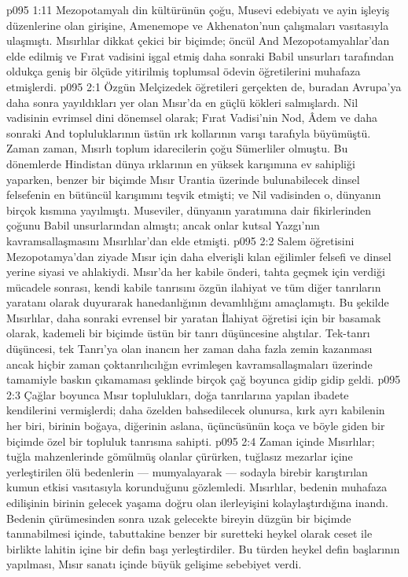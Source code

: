 \vs p095 1:11 Mezopotamyalı din kültürünün çoğu, Musevi edebiyatı ve ayin işleyiş düzenlerine olan girişine, Amenemope ve Akhenaton’nun çalışmaları vasıtasıyla ulaşmıştı. Mısırlılar dikkat çekici bir biçimde; öncül And Mezopotamyalılar’dan elde edilmiş ve Fırat vadisini işgal etmiş daha sonraki Babil unsurları tarafından oldukça geniş bir ölçüde yitirilmiş toplumsal ödevin öğretilerini muhafaza etmişlerdi.
\vs p095 2:1 Özgün Melçizedek öğretileri gerçekten de, buradan Avrupa’ya daha sonra yayıldıkları yer olan Mısır’da en güçlü kökleri salmışlardı. Nil vadisinin evrimsel dini dönemsel olarak; Fırat Vadisi’nin Nod, Âdem ve daha sonraki And topluluklarının üstün ırk kollarının varışı tarafıyla büyümüştü. Zaman zaman, Mısırlı toplum idarecilerin çoğu Sümerliler olmuştu. Bu dönemlerde Hindistan dünya ırklarının en yüksek karışımına ev sahipliği yaparken, benzer bir biçimde Mısır Urantia üzerinde bulunabilecek dinsel felsefenin en bütüncül karışımını teşvik etmişti; ve Nil vadisinden o, dünyanın birçok kısmına yayılmıştı. Museviler, dünyanın yaratımına dair fikirlerinden çoğunu Babil unsurlarından almıştı; ancak onlar kutsal Yazgı’nın kavramsallaşmasını Mısırlılar’dan elde etmişti.
\vs p095 2:2 Salem öğretisini Mezopotamya’dan ziyade Mısır için daha elverişli kılan eğilimler felsefi ve dinsel yerine siyasi ve ahlakiydi. Mısır’da her kabile önderi, tahta geçmek için verdiği mücadele sonrası, kendi kabile tanrısını özgün ilahiyat ve tüm diğer tanrıların yaratanı olarak duyurarak hanedanlığının devamlılığını amaçlamıştı. Bu şekilde Mısırlılar, daha sonraki evrensel bir yaratan İlahiyat öğretisi için bir basamak olarak, kademeli bir biçimde üstün bir tanrı düşüncesine alıştılar. Tek\hyp{}tanrı düşüncesi, tek Tanrı’ya olan inancın her zaman daha fazla zemin kazanması ancak hiçbir zaman çoktanrılıcılığın evrimleşen kavramsallaşmaları üzerinde tamamiyle baskın çıkamaması şeklinde birçok çağ boyunca gidip gidip geldi.
\vs p095 2:3 Çağlar boyunca Mısır toplulukları, doğa tanrılarına yapılan ibadete kendilerini vermişlerdi; daha özelden bahsedilecek olunursa, kırk ayrı kabilenin her biri, birinin boğaya, diğerinin aslana, üçüncüsünün koça ve böyle giden bir biçimde özel bir topluluk tanrısına sahipti.
\vs p095 2:4 Zaman içinde Mısırlılar; tuğla mahzenlerinde gömülmüş olanlar çürürken, tuğlasız mezarlar içine yerleştirilen ölü bedenlerin --- mumyalayarak --- sodayla birebir karıştırılan kumun etkisi vasıtasıyla korunduğunu gözlemledi. Mısırlılar, bedenin muhafaza edilişinin birinin gelecek yaşama doğru olan ilerleyişini kolaylaştırdığına inandı. Bedenin çürümesinden sonra uzak gelecekte bireyin düzgün bir biçimde tanınabilmesi içinde, tabuttakine benzer bir suretteki heykel olarak ceset ile birlikte lahitin içine bir defin başı yerleştirdiler. Bu türden heykel defin başlarının yapılması, Mısır sanatı içinde büyük gelişime sebebiyet verdi.
